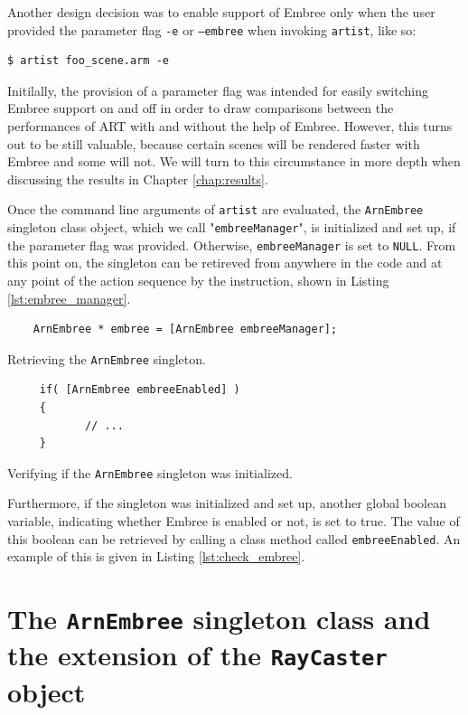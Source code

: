 Another design decision was to enable support of Embree only when the user provided the parameter flag \texttt{-e} or \texttt{--embree} when invoking \texttt{artist}, like so:

\begin{Verbatim}
$ artist foo_scene.arm -e
\end{Verbatim}

Initilally, the provision of a parameter flag was intended for easily switching Embree support on and off in order to draw comparisons between the performances of ART with and without the help of Embree. However, this turns out to be still valuable, because certain scenes will be rendered faster with Embree and some will not. We will turn to this circumstance in more depth when discussing the results in Chapter \ref{chap:results}. 

Once the command line arguments of \texttt{artist} are evaluated, the \texttt{ArnEmbree} singleton class object, which we call "\texttt{embreeManager}", is initialized and set up, if the parameter flag was provided. Otherwise, \texttt{embreeManager} is set to \texttt{NULL}. From this point on, the  singleton can be retireved from anywhere in the code and at any point of the action sequence by the instruction, shown in Listing \ref{lst:embree_manager}.

\begin{listing} 
	\begin{lstlisting}
	ArnEmbree * embree = [ArnEmbree embreeManager];
	\end{lstlisting}
	\caption{Retrieving the \texttt{ArnEmbree} singleton.}
	\label{lst:embree_manager}
\end{listing}


\begin{listing}
	\begin{lstlisting}
	 if( [ArnEmbree embreeEnabled] ) 
	 {
	 		// ...
	 }
	\end{lstlisting}
	\caption{Verifying if the \texttt{ArnEmbree} singleton was initialized.}
	\label{lst:check_embree}
\end{listing}

Furthermore, if the singleton was initialized and set up, another global boolean variable, indicating whether Embree is enabled or not, is set to true. The value of this boolean can be retrieved by calling a class method called \texttt{embreeEnabled}. An example of this is given in Listing \ref{lst:check_embree}.

\section{The \texttt{ArnEmbree} singleton class and the extension of the \texttt{RayCaster} object}

